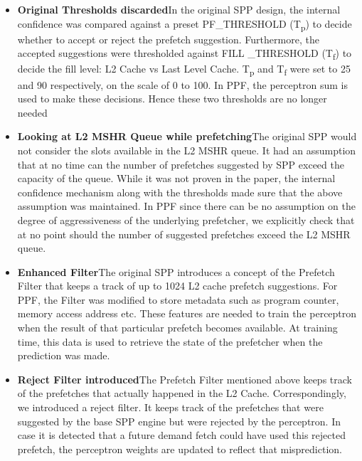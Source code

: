 \begin{itemize}
\item \textbf{Original Thresholds discarded}\newline In the original
  SPP design, the internal confidence was compared against a preset
  PF\_THRESHOLD (T\textsubscript{p}) to decide whether to accept or reject the
  prefetch suggestion.  Furthermore, the accepted suggestions were thresholded
  against FILL \_THRESHOLD (T\textsubscript{f}) to decide the fill level: L2
  Cache vs Last Level Cache.  T\textsubscript{p} and T\textsubscript{f} were
  set to 25 and 90 respectively, on the scale of 0 to 100.  In PPF, the
  perceptron sum is used to make these decisions.  Hence these two thresholds
  are no longer needed


\item \textbf{Looking at L2 MSHR Queue while prefetching}\newline The original
SPP would not consider the slots available in the L2 MSHR queue.  It had an
assumption that at no time can the number of prefetches suggested by SPP
exceed the capacity of the queue.  While it was not proven in the paper, the
internal confidence mechanism along with the thresholds made sure that the
above assumption was maintained.  In PPF since there can be no assumption on
the degree of aggressiveness of the underlying prefetcher, we explicitly check
that at no point should the number of suggested prefetches exceed the L2 MSHR
queue.

\item \textbf{Enhanced Filter}\newline The original SPP introduces a concept of
the Prefetch Filter that keeps a track of up to 1024 L2 cache prefetch
suggestions.  For PPF, the Filter was modified to store metadata such as program
counter, memory access address etc.  These features are needed to train the perceptron
when the result of that particular prefetch becomes available.  At training time,
this data is used to retrieve the state of the prefetcher when the prediction
was made.

\item \textbf{Reject Filter introduced}\newline The Prefetch Filter mentioned
above keeps track of the prefetches that actually happened in the L2 Cache.
Correspondingly, we introduced a reject filter.  It keeps track of the
prefetches that were suggested by the base SPP engine but were rejected by the
perceptron.  In case it is detected that a future demand fetch could have used
this rejected prefetch, the perceptron weights are updated to reflect that
misprediction.

\end{itemize}

